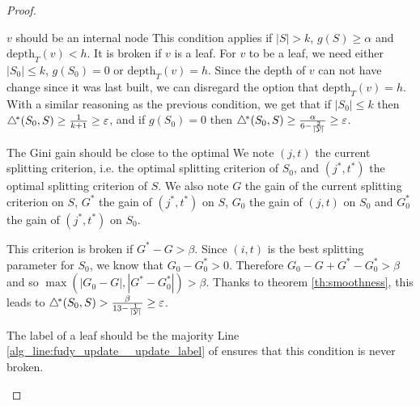 \begin{proof}
    \begin{paragraph}{$v$ should be an internal node}
        This condition applies if $|S| > k$, $g(S)\geq \alpha$ and $\text{depth}_T(v) < h$. It is broken if $v$ is a leaf. For $v$ to be a leaf, we need either $|S_0|\leq k$, $g(S_0) = 0$ or $\text{depth}_T(v) = h$. Since the depth of $v$ can not have change since it was last built, we can disregard the option that $\text{depth}_T(v) = h$. With a similar reasoning as the previous condition, we get that if $|S_0| \leq k$ then $\triangle^{\!*}(S_0, S) \geq \frac{1}{k+1} \geq \varepsilon$, and if $g(S_0) = 0$ then $\triangle^{\!*}(S_0, S) \geq \frac{\alpha}{6 - \frac{2}{|\mathcal{Y}|}} \geq \varepsilon$.
    \end{paragraph}

    \begin{paragraph}{The Gini gain should be close to the optimal}
        We note $(j, t)$ the current splitting criterion, i.e. the optimal splitting criterion of $S_0$, and $(j^*, t^*)$ the optimal splitting criterion of $S$. We also note $G$ the gain of the current splitting criterion on $S$, $G^*$ the gain of $(j^*, t^*)$ on $S$, $G_0$ the gain of $(j, t)$ on $S_0$ and $G_0^*$ the gain of $(j^*, t^*)$ on $S_0$.

        This criterion is broken if $G^* - G > \beta$. Since $(i, t)$ is the best splitting parameter for $S_0$, we know that $G_0 - G_0^* > 0$. Therefore $G_0 - G + G^* - G_0^* > \beta$ and so $\max(|G_0 - G|, |G^* - G_0^*|) > \beta$. Thanks to theorem \ref{th:smoothness}, this leads to $\triangle^{\!*}(S_0, S) > \frac{\beta}{13 - \frac{1}{|\mathcal{Y}|}} \geq \varepsilon$.
    \end{paragraph}
    \begin{paragraph}{The label of a leaf should be the majority}
        Line \ref{alg_line:fudy_update__update_label} of \AlgoUpdate{} ensures that this condition is never broken.
    \end{paragraph}
\end{proof}

